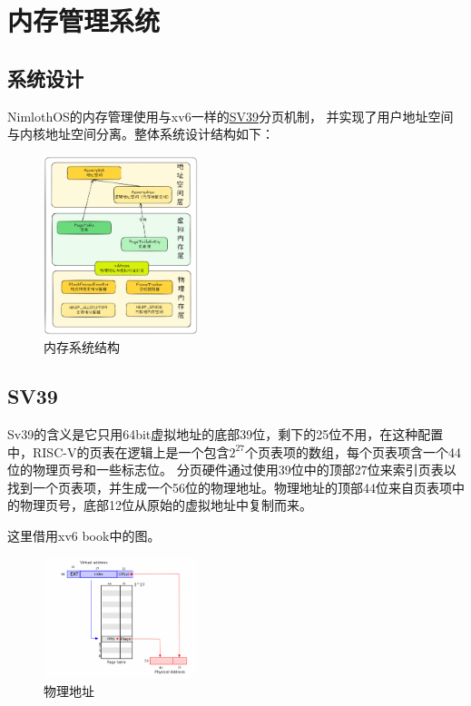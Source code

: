 \chapter{内存管理系统}

\section{系统设计}

NimlothOS的内存管理使用与xv6一样的\href{https://five-embeddev.com/riscv-priv-isa-manual/Priv-v1.12/supervisor.html#sec:sv39}{SV39}分页机制，
并实现了用户地址空间与内核地址空间分离。整体系统设计结构如下：

\begin{figure}[htbp]
    \centering
    \includegraphics[width=0.4\textwidth]{../image/内存.png}
    \caption{内存系统结构}
    \label{fig:kernel-elf}
\end{figure}

\section{SV39}

Sv39的含义是它只用64bit虚拟地址的底部39位，剩下的25位不用，在这种配置中，RISC-V的页表在逻辑上是一个包含$2^{27}$个页表项的数组，每个页表项含一个44位的物理页号和一些标志位。
分页硬件通过使用39位中的顶部27位来索引页表以找到一个页表项，并生成一个56位的物理地址。物理地址的顶部44位来自页表项中的物理页号，底部12位从原始的虚拟地址中复制而来。

这里借用xv6 book中的图。

\begin{figure}[htbp]
    \centering
    \includegraphics[width=0.4\textwidth]{../image/物理地址.png}
    \caption{物理地址}
    \label{fig:物理地址}
\end{figure}

